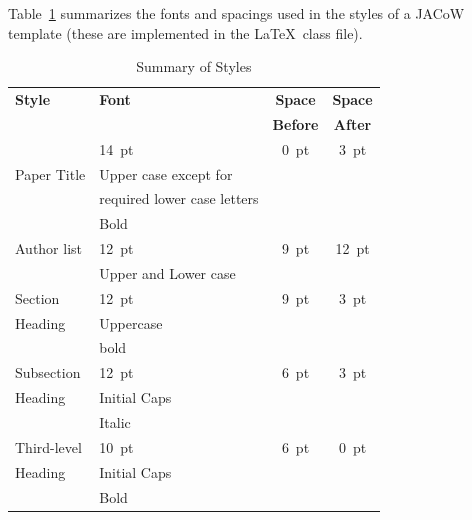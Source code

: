 \documentclass[a4paper,
              ]{jacow}
\begin{document}
Table~\ref{style-tab} summarizes the fonts and spacings used in the styles of
a JACoW template (these are implemented in the \LaTeX\ class file).
\begin{table}[h!t]
    \setlength\tabcolsep{3.8pt}
    \caption{Summary of Styles}
    \label{style-tab}
    \begin{tabular}{@{}llcc@{}}
        \toprule
        \textbf{Style} & \textbf{Font}               & \textbf{Space}  & \textbf{Space} \\
                       &                             & \textbf{Before} & \textbf{After} \\
        \midrule
                       & \SI{14}{pt}                 & \SI{0}{pt}      & \SI{3}{pt}  \\
          Paper Title  & Upper case except for       &                 &      \\
                       & required lower case letters &                 &      \\   %
                       & Bold                        &                 &      \\
         \midrule
          Author list  & \SI{12}{pt}                 & \SI{9}{pt}      & \SI{12}{pt} \\
                       & Upper and Lower case        &                 &      \\
         \midrule
         Section       & \SI{12}{pt}                 & \SI{9}{pt}      & \SI{3}{pt}  \\
         Heading       & Uppercase                   &                 &      \\
                       & bold                        &                 &      \\
        \midrule
         Subsection    & \SI{12}{pt}                 & \SI{6}{pt}      & \SI{3}{pt}  \\
         Heading       & Initial Caps                &                 &      \\
                       & Italic                      &                 &      \\
        \midrule
         Third-level   & \SI{10}{pt}                 & \SI{6}{pt}           & \SI{0}{pt}  \\
         Heading       & Initial Caps                &                 &      \\
                       & Bold                        &                 &      \\

\end{tabular}
\end{table}
\end{document}
